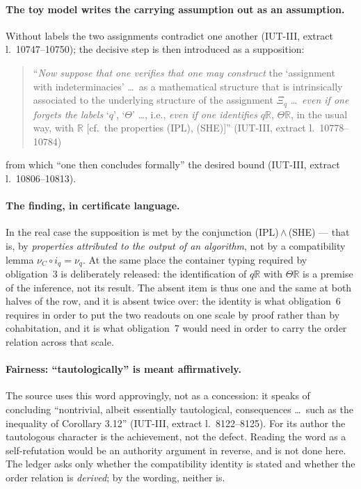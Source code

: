 \documentclass[11pt,a4paper]{article}
\theoremstyle{definition}
\newcommand{\anchor}[2]{(#1, extract l.~#2)}
\begin{document}
\paragraph{The toy model writes the carrying assumption out as an assumption.}
Without labels the two assignments contradict one another
\anchor{IUT-III}{10747--10750}; the decisive step is then introduced as a
supposition:

\begin{quote}\small
``\emph{Now suppose that one verifies that one may construct} the `assignment with
indeterminacies' \dots\ as a mathematical structure that is intrinsically
associated to the underlying structure of the assignment $\Xi_q$ \dots\
\emph{even if one forgets the labels} `$q$', `$\Theta$' \dots, i.e., \emph{even if
one identifies} $q\mathbb{R}$, $\Theta\mathbb{R}$, in the usual way, with
$\mathbb{R}$ [cf.\ the properties (IPL), (SHE)]''
\hfill\anchor{IUT-III}{10778--10784}
\end{quote}

from which ``one then concludes formally'' the desired bound
\anchor{IUT-III}{10806--10813}.

\paragraph{The finding, in certificate language.} In the real case the supposition
is met by the conjunction (IPL)\,$\wedge$\,(SHE) --- that is, by \emph{properties
attributed to the output of an algorithm}, not by a compatibility lemma
$\nu_C \circ i_q = \nu_q$. At the same place the container typing required by
obligation~3 is deliberately released: the identification of $q\mathbb{R}$ with
$\Theta\mathbb{R}$ is a premise of the inference, not its result. The absent item
is thus one and the same at both halves of the row, and it is absent twice over:
the identity is what obligation~6 requires in order to put the two readouts on
one scale by proof rather than by cohabitation, and it is what obligation~7 would
need in order to carry the order relation across that scale.

\paragraph{Fairness: ``tautologically'' is meant affirmatively.} The source uses
this word approvingly, not as a concession: it speaks of concluding ``nontrivial,
albeit essentially tautological, consequences \dots\ such as the inequality of
Corollary 3.12'' \anchor{IUT-III}{8122--8125}. For its author the tautologous
character is the achievement, not the defect. Reading the word as a
self-refutation would be an authority argument in reverse, and is not done here.
The ledger asks only whether the compatibility identity is stated and whether the
order relation is \emph{derived}; by the wording, neither is.
\end{document}
